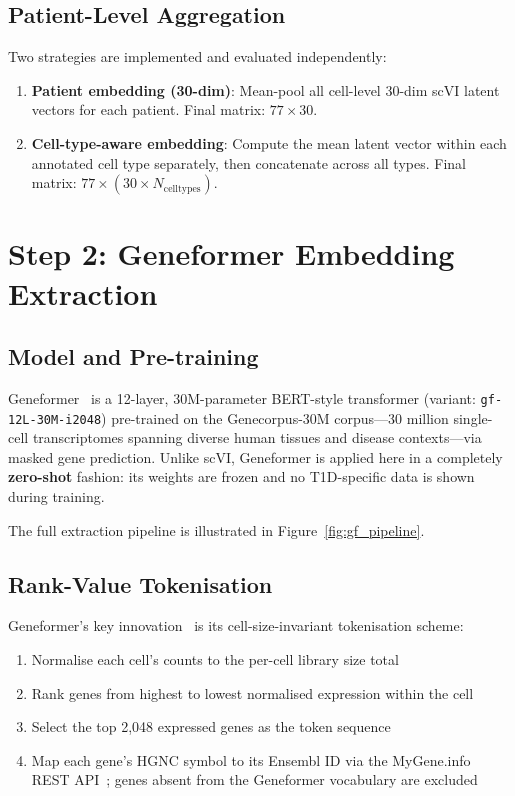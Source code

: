 \subsection{Patient-Level Aggregation}

Two strategies are implemented and evaluated independently:

\begin{enumerate}
    \item \textbf{Patient embedding (30-dim)}: Mean-pool all cell-level 30-dim scVI latent vectors for each patient. Final matrix: $77 \times 30$.
    \item \textbf{Cell-type-aware embedding}: Compute the mean latent vector within each annotated cell type separately, then concatenate across all types. Final matrix: $77 \times (30 \times N_{\text{celltypes}})$.
\end{enumerate}

\section{Step 2: Geneformer Embedding Extraction}

\subsection{Model and Pre-training}

Geneformer~\cite{theodoris2023transfer} is a 12-layer, 30M-parameter BERT-style transformer (variant: \texttt{gf-12L-30M-i2048}) pre-trained on the Genecorpus-30M corpus---30 million single-cell transcriptomes spanning diverse human tissues and disease contexts---via masked gene prediction. Unlike scVI, Geneformer is applied here in a completely \textbf{zero-shot} fashion: its weights are frozen and no T1D-specific data is shown during training.

The full extraction pipeline is illustrated in Figure~\ref{fig:gf_pipeline}.



\subsection{Rank-Value Tokenisation}

Geneformer's key innovation~\cite{theodoris2023transfer} is its cell-size-invariant tokenisation scheme:
\begin{enumerate}
    \item Normalise each cell's counts to the per-cell library size total
    \item Rank genes from highest to lowest normalised expression within the cell
    \item Select the top 2,048 expressed genes as the token sequence
    \item Map each gene's HGNC symbol to its Ensembl ID via the MyGene.info REST API~\cite{theodoris2023transfer}; genes absent from the Geneformer vocabulary are excluded
\end{enumerate}

